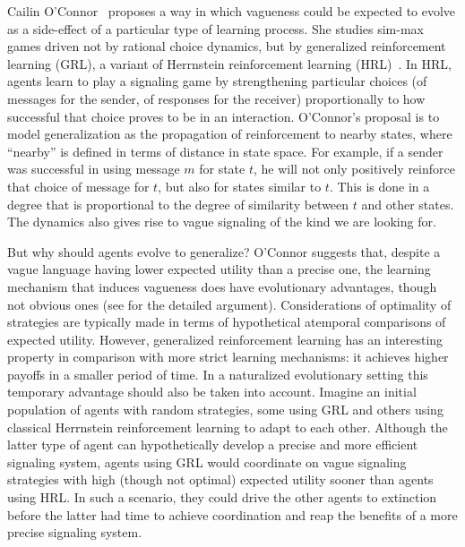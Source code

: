 \documentclass[a4paper]{article}
\begin{document}
Cailin O'Connor~\parencite*{oconnor_evolution_2014} proposes a way in which vagueness could be expected to evolve as a side-effect of a particular type of learning process.
She studies sim-max games driven not by rational choice dynamics, but by generalized reinforcement learning (GRL), a variant of Herrnstein reinforcement learning (HRL)~\parencite{roth_learning_1995}.
In HRL, agents learn to play a signaling game by strengthening particular choices (of messages for the sender, of responses for the receiver) proportionally to how successful that choice proves to be in an interaction.
O'Connor's proposal is to model generalization as the propagation of reinforcement to nearby states, where ``nearby'' is defined in terms of distance in state space.
For example, if a sender was successful in using message $m$ for state $t$, he will not only positively reinforce that choice of message for $t$, but also for states similar to $t$.
This is done in a degree that is proportional to the degree of similarity between $t$ and other states.
The dynamics also gives rise to vague signaling of the kind we are looking for.

But why should agents evolve to generalize?
O'Connor suggests that, despite a vague language having lower expected utility than a precise one, the learning mechanism that induces vagueness does have evolutionary advantages, though not obvious ones (see \textcite{oconnor_evolving_2015} for the detailed argument).
Considerations of optimality of strategies are typically made in terms of hypothetical atemporal comparisons of expected utility.
However, generalized reinforcement learning has an interesting property in comparison with more strict learning mechanisms: it achieves higher payoffs in a smaller period of time.
In a naturalized evolutionary setting this temporary advantage should also be taken into account.
Imagine an initial population of agents with random strategies, some using GRL and others using classical Herrnstein reinforcement learning to adapt to each other.
Although the latter type of agent can hypothetically develop a precise and more efficient signaling system, agents using GRL would coordinate on vague signaling strategies with high (though not optimal) expected utility sooner than agents using HRL.
In such a scenario, they could drive the other agents to extinction before the latter had time to achieve coordination and reap the benefits of a more precise signaling system.
\end{document}
